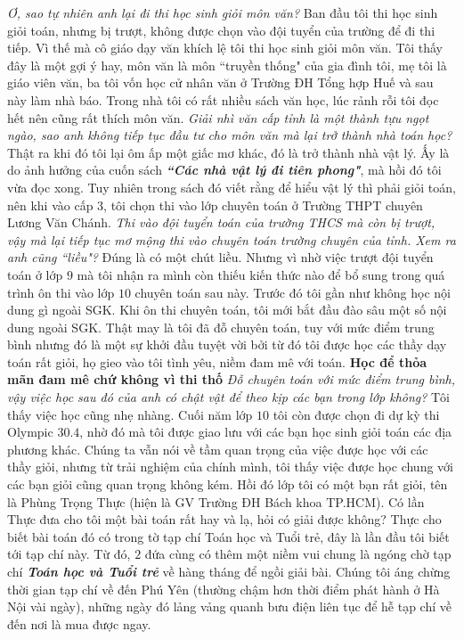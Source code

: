 \begin{multicols}{2}
	\vskip 0.1cm
	\textit{Ơ, sao tự nhiên anh lại đi thi học sinh giỏi môn văn?}
	\vskip 0.1cm 
	Ban đầu tôi thi học sinh giỏi toán, nhưng bị trượt, không được chọn vào đội tuyển của trường để đi thi tiếp. Vì thế mà cô giáo dạy văn khích lệ tôi thi học sinh giỏi môn văn. Tôi thấy đây là một gợi ý hay, môn văn là môn ``truyền thống" của gia đình tôi, mẹ tôi là giáo viên văn, ba tôi vốn học cử nhân văn ở Trường ĐH Tổng  hợp Huế và sau này làm nhà báo. Trong nhà tôi có rất nhiều sách văn học, lúc rảnh rỗi tôi đọc hết nên cũng rất thích môn văn.  
	\vskip 0.1cm
	\textit{Giải nhì văn cấp tỉnh là một thành tựu ngọt ngào, sao anh không tiếp tục đầu tư cho môn văn mà lại trở thành nhà toán học?}
	\vskip 0.1cm 
	Thật ra khi đó tôi lại ôm ấp một giấc mơ khác, đó là trở thành nhà vật lý. Ấy là do ảnh hưởng của cuốn sách \textbf{\color{diendantoanhoc}\textit{``Các nhà vật lý đi tiên phong"}}, mà hồi đó tôi vừa đọc xong. Tuy nhiên trong sách đó viết rằng để hiểu vật lý thì phải giỏi toán, nên khi vào cấp $3$, tôi chọn thi vào lớp chuyên toán ở Trường THPT chuyên Lương Văn Chánh. 
	\vskip 0.1cm
	\textit{Thi vào đội tuyển toán của trường THCS mà còn bị trượt, vậy mà lại tiếp tục mơ mộng thi vào chuyên toán trường chuyên của tỉnh. Xem ra anh cũng ``liều"?} 
	\vskip 0.1cm
	Đúng là có một chút liều. Nhưng vì nhờ việc trượt đội tuyển toán ở lớp $9$ mà tôi nhận ra mình còn thiếu kiến thức nào để bổ sung trong quá trình ôn thi vào lớp $10$ chuyên toán sau này. Trước đó tôi gần như không học nội dung gì ngoài SGK. Khi ôn thi chuyên toán, tôi mới bắt đầu đào sâu một số nội dung ngoài SGK.
	\vskip 0.1cm
	Thật may là tôi đã đỗ chuyên toán, tuy với mức điểm trung bình nhưng đó là một sự khởi đầu tuyệt vời bởi từ đó tôi được học các thầy dạy toán rất giỏi, họ gieo vào tôi tình yêu, niềm đam mê với toán. 
	\vskip 0.1cm
	\textbf{\color{diendantoanhoc}Học để thỏa mãn đam mê chứ không vì thi thố}
	\vskip 0.1cm
	\textit{Đỗ chuyên toán với mức điểm trung bình, vậy việc học sau đó của anh có chật vật để theo kịp các bạn trong lớp không?}
	\vskip 0.1cm
	Tôi thấy việc học cũng nhẹ nhàng. Cuối năm lớp $10$ tôi còn được chọn đi dự kỳ thi Olympic $30.4$, nhờ đó mà tôi được giao lưu với các bạn học sinh giỏi toán các địa phương khác. Chúng ta vẫn nói về tầm quan trọng của việc được học với các thầy giỏi, nhưng từ trải nghiệm của chính mình, tôi thấy việc được học chung với các bạn giỏi cũng quan trọng không kém. 
	\vskip 0.1cm
	Hồi đó lớp tôi có một bạn rất giỏi, tên là Phùng Trọng Thực (hiện là GV Trường ĐH Bách khoa TP.HCM). Có lần Thực đưa cho tôi một bài toán rất hay và lạ, hỏi có giải được không? Thực cho biết bài toán đó có trong tờ tạp chí Toán học và Tuổi trẻ, đây là lần đầu tôi biết tới tạp chí này. Từ đó, $2$ đứa cùng có thêm một niềm vui chung là ngóng chờ tạp chí \textbf{\color{diendantoanhoc}\textit{Toán học và Tuổi trẻ}} về hàng tháng để ngồi giải bài. Chúng tôi áng chừng thời gian tạp chí về đến Phú Yên (thường chậm hơn thời điểm phát hành ở Hà Nội vài ngày), những ngày đó lảng vảng quanh bưu điện liên tục để hễ tạp chí về đến nơi là mua được ngay. 

\end{multicols}
